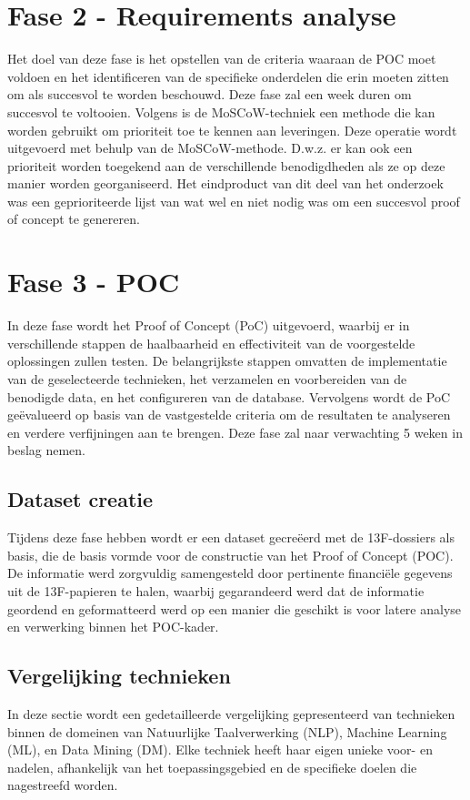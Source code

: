 \section{Fase 2 - Requirements analyse}
Het doel van deze fase is het opstellen van de criteria waaraan de POC moet voldoen en het identificeren van de specifieke onderdelen die erin moeten zitten om als succesvol te worden beschouwd. Deze fase zal een week duren om succesvol te voltooien. Volgens \autocite{Achimigu2014} is de MoSCoW-techniek een methode die kan worden gebruikt om prioriteit toe te kennen aan leveringen. Deze operatie wordt uitgevoerd met behulp van de MoSCoW-methode. D.w.z. er kan ook een prioriteit worden toegekend aan de verschillende benodigdheden als ze op deze manier worden georganiseerd. Het eindproduct van dit deel van het onderzoek was een geprioriteerde lijst van wat wel en niet nodig was om een succesvol proof of concept te genereren. 

\section{Fase 3 - POC}  
In deze fase wordt het Proof of Concept (PoC) uitgevoerd, waarbij er in verschillende stappen de haalbaarheid en effectiviteit van de voorgestelde oplossingen zullen testen. De belangrijkste stappen omvatten de implementatie van de geselecteerde technieken, het verzamelen en voorbereiden van de benodigde data, en het configureren van de database. Vervolgens wordt de PoC geëvalueerd op basis van de vastgestelde criteria om de resultaten te analyseren en verdere verfijningen aan te brengen. Deze fase zal naar verwachting 5 weken in beslag nemen.
\subsection{Dataset creatie}
Tijdens deze fase hebben wordt er een dataset gecreëerd met de 13F-dossiers als basis, die de basis vormde voor de constructie van het Proof of Concept (POC). De informatie werd zorgvuldig samengesteld door pertinente financiële gegevens uit de 13F-papieren te halen, waarbij gegarandeerd werd dat de informatie geordend en geformatteerd werd op een manier die geschikt is voor latere analyse en verwerking binnen het POC-kader.

\subsection{Vergelijking technieken}
In deze sectie wordt een gedetailleerde vergelijking gepresenteerd van technieken binnen de domeinen van Natuurlijke Taalverwerking (NLP), Machine Learning (ML), en Data Mining (DM). Elke techniek heeft haar eigen unieke voor- en nadelen, afhankelijk van het toepassingsgebied en de specifieke doelen die nagestreefd worden.

